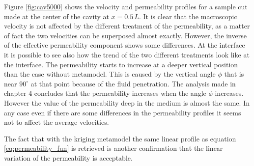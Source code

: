 Figure \ref{fig:cav5000} shows the velocity and permeability profiles for a sample cut made at the center of the cavity at $x=0.5\,L$.
It is clear that the macroscopic velocity is not affected by the different treatment of the permeability, as a matter of fact the two velocities can be superposed almost exactly.
However, the inverse of the effective permeability component shows some differences. At the interface it is possible to see also how the trend of the two different treatments look like at the interface. The permeability starts to increase at a deeper vertical position than the case without metamodel. This is caused by the vertical angle $\phi$ that is near $90^\circ$ at that point because of the fluid penetration. The analysis made in chapter 4 concludes that the permeability increases when the angle $\phi$ increases.
However the value of the permeability deep in the medium is almost the same. 
In any case even if there are some differences in the permeability profiles it seems not to affect the average velocities.

The fact that with the kriging metamodel the same linear profile as equation \ref{eq:permeability_fun} is retrieved is another confirmation that the linear variation of the permeability is acceptable.


